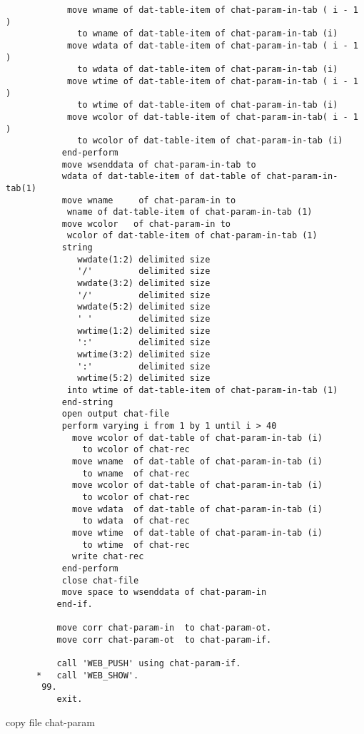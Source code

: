 {{\begin{verbatim}
            move wname of dat-table-item of chat-param-in-tab ( i - 1 ) 
              to wname of dat-table-item of chat-param-in-tab (i)
            move wdata of dat-table-item of chat-param-in-tab ( i - 1 ) 
              to wdata of dat-table-item of chat-param-in-tab (i)
            move wtime of dat-table-item of chat-param-in-tab ( i - 1 ) 
              to wtime of dat-table-item of chat-param-in-tab (i)
            move wcolor of dat-table-item of chat-param-in-tab( i - 1 ) 
              to wcolor of dat-table-item of chat-param-in-tab (i)
           end-perform
           move wsenddata of chat-param-in-tab to
           wdata of dat-table-item of dat-table of chat-param-in-tab(1)
           move wname     of chat-param-in to 
            wname of dat-table-item of chat-param-in-tab (1)
           move wcolor   of chat-param-in to 
            wcolor of dat-table-item of chat-param-in-tab (1)
           string 
              wwdate(1:2) delimited size 
              '/'         delimited size
              wwdate(3:2) delimited size 
              '/'         delimited size
              wwdate(5:2) delimited size 
              ' '         delimited size
              wwtime(1:2) delimited size 
              ':'         delimited size
              wwtime(3:2) delimited size 
              ':'         delimited size
              wwtime(5:2) delimited size 
            into wtime of dat-table-item of chat-param-in-tab (1)
           end-string
           open output chat-file
           perform varying i from 1 by 1 until i > 40
             move wcolor of dat-table of chat-param-in-tab (i) 
               to wcolor of chat-rec
             move wname  of dat-table of chat-param-in-tab (i) 
               to wname  of chat-rec
             move wcolor of dat-table of chat-param-in-tab (i) 
               to wcolor of chat-rec
             move wdata  of dat-table of chat-param-in-tab (i) 
               to wdata  of chat-rec
             move wtime  of dat-table of chat-param-in-tab (i) 
               to wtime  of chat-rec
             write chat-rec
           end-perform
           close chat-file
           move space to wsenddata of chat-param-in
          end-if.
      
          move corr chat-param-in  to chat-param-ot.
          move corr chat-param-ot  to chat-param-if.
      
          call 'WEB_PUSH' using chat-param-if.
      *   call 'WEB_SHOW'.
       99.
          exit.
\end{verbatim}
{\gt copy file} chat-param

}}

